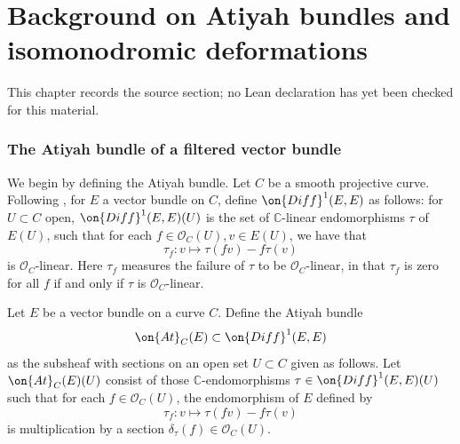 \chapter{Background on Atiyah bundles and isomonodromic deformations}
\label{geometric-local-systems-general-curves-isomonodromy-chapter-03}

\begin{remark}
\label{geometric-local-systems-general-curves-isomonodromy-chapter-03-source}
This chapter records the source section; no Lean declaration has yet been checked for this material.
\notready
\end{remark}

\label{section:deformation-theory}


\subsection{The Atiyah bundle of a filtered vector bundle}
\label{subsection:atiyah-bundle}


We begin by defining the Atiyah bundle.
Let $C$ be a smooth projective curve.
Following
\cite[16.8.1]{EGAIV.4},
for $E$ a vector bundle on $C$, define $\on{Diff}^1(E,E)$ as follows: for
$U\subset C$ open, $\on{Diff}^1({E}, {E})(U)$ is the set of
$\mathbb{C}$-linear endomorphisms $\tau$ of $E(U)$, such that for each $f\in
\mathscr{O}_C(U), v\in E(U)$, we have that $$\tau_f: v\mapsto
\tau(fv)-f\tau(v)$$ is $\mathscr{O}_C$-linear.
Here $\tau_f$ measures the failure of $\tau$ to be $\mathscr{O}_C$-linear, in
that $\tau_f$ is zero for all $f$ if and only if $\tau$ is $\mathscr{O}_C$-linear.

\begin{definition}
	\label{definition:atiyah}
	Let $E$ be a
vector bundle on a curve $C$.
Define the Atiyah bundle $$\on{At}_C(E)\subset \on{Diff}^1({E}, {E})$$ as the
subsheaf with sections on an open set $U \subset C$ given as follows.
Let $\on{At}_C(E)(U)$ consist of those $\mathbb{C}$-endomorphisms $\tau \in
\on{Diff}^1({E}, {E})(U)$ such that for each $f\in \mathscr{O}_C(U)$, the endomorphism of ${E}$ defined by $$\tau_f: v\mapsto \tau(fv)-f\tau(v)$$ is multiplication by a section $\delta_\tau(f)\in \mathscr{O}_C(U)$.
\end{definition}

